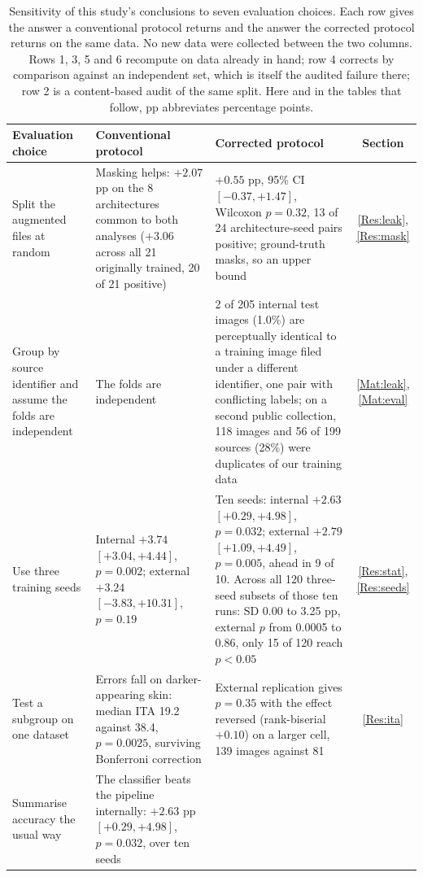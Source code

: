 \documentclass{melba}
\begin{document}
\begin{table}[t]
\centering
\caption{Sensitivity of this study's conclusions to seven evaluation choices. Each row gives the answer a conventional protocol returns and the answer the corrected protocol returns on the same data. No new data were collected between the two columns. Rows 1, 3, 5 and 6 recompute on data already in hand; row 4 corrects by comparison against an independent set, which is itself the audited failure there; row 2 is a content-based audit of the same split. Here and in the tables that follow, pp abbreviates percentage points.}
\small
\begin{tabular}{|p{}|p{}|p{}|c|}
\hline
\textbf{Evaluation choice} & \textbf{Conventional protocol} & \textbf{Corrected protocol} & \textbf{Section} \\
\hline
Split the augmented files at random
& Masking helps: $+2.07$ pp on the 8 architectures common to both analyses ($+3.06$ across all 21 originally trained, 20 of 21 positive)
& $+0.55$ pp, 95\% CI $[-0.37,+1.47]$, Wilcoxon $p=0.32$, 13 of 24 architecture-seed pairs positive; ground-truth masks, so an upper bound
& \ref{Res:leak}, \ref{Res:mask} \\
\hline
Group by source identifier and assume the folds are independent
& The folds are independent
& 2 of 205 internal test images (1.0\%) are perceptually identical to a training image filed under a different identifier, one pair with conflicting labels; on a second public collection, 118 images and 56 of 199 sources (28\%) were duplicates of our training data
& \ref{Mat:leak}, \ref{Mat:eval} \\
\hline
Use three training seeds
& Internal $+3.74$ $[+3.04,+4.44]$, $p=0.002$; external $+3.24$ $[-3.83,+10.31]$, $p=0.19$
& Ten seeds: internal $+2.63$ $[+0.29,+4.98]$, $p=0.032$; external $+2.79$ $[+1.09,+4.49]$, $p=0.005$, ahead in 9 of 10. Across all 120 three-seed subsets of those ten runs: SD 0.00 to 3.25 pp, external $p$ from 0.0005 to 0.86, only 15 of 120 reach $p<0.05$
& \ref{Res:stat}, \ref{Res:seeds} \\
\hline
Test a subgroup on one dataset
& Errors fall on darker-appearing skin: median ITA 19.2 against 38.4, $p=0.0025$, surviving Bonferroni correction
& External replication gives $p=0.35$ with the effect reversed (rank-biserial $+0.10$) on a larger cell, 139 images against 81
& \ref{Res:ita} \\
\hline
Summarise accuracy the usual way
& The classifier beats the pipeline internally: $+2.63$ pp $[+0.29,+4.98]$, $p=0.032$, over ten seeds

\end{tabular}
\end{table}
\end{document}
